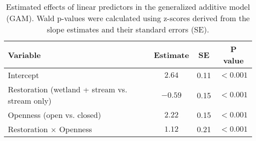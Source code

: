 \begin{table}[ht]
\centering
\caption{Estimated effects of linear predictors in the generalized additive model (GAM).
             Wald p-values were calculated using z-scores derived from the slope estimates and their standard errors (SE).} 
\label{tab:gam-est}
\begingroup\small
\begin{tabular}{lccc}
  \hline
Variable & Estimate & SE & P value \\ 
  \hline
Intercept & $2.64$ & 0.11 & $<0.001$ \\ 
  Restoration (wetland + stream vs. stream only) & $-0.59$ & 0.15 & $<0.001$ \\ 
  Openness (open vs. closed) & $2.22$ & 0.15 & $<0.001$ \\ 
  Restoration $\times$ Openness & $1.12$ & 0.21 & $<0.001$ \\ 
   \hline
\end{tabular}
\endgroup
\end{table}
